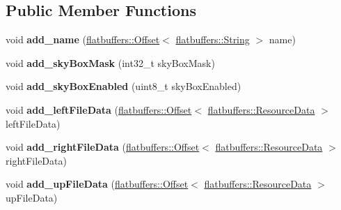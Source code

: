 \subsection*{Public Member Functions}
\begin{DoxyCompactItemize}
\item 
\mbox{\label{structflatbuffers_1_1GameNode3DOptionBuilder_a25a56460a7eba028eaffec8fe47cb77d}} 
void {\bfseries add\+\_\+name} (\hyperlink{structflatbuffers_1_1Offset}{flatbuffers\+::\+Offset}$<$ \hyperlink{structflatbuffers_1_1String}{flatbuffers\+::\+String} $>$ name)
\item 
\mbox{\label{structflatbuffers_1_1GameNode3DOptionBuilder_aefb3c9e9c8c64768e4cdee629ce92241}} 
void {\bfseries add\+\_\+sky\+Box\+Mask} (int32\+\_\+t sky\+Box\+Mask)
\item 
\mbox{\label{structflatbuffers_1_1GameNode3DOptionBuilder_a944f27de427ea6a7b1f48340d83828dd}} 
void {\bfseries add\+\_\+sky\+Box\+Enabled} (uint8\+\_\+t sky\+Box\+Enabled)
\item 
\mbox{\label{structflatbuffers_1_1GameNode3DOptionBuilder_aacdd1c7fdbfa3c948e5015455dd48372}} 
void {\bfseries add\+\_\+left\+File\+Data} (\hyperlink{structflatbuffers_1_1Offset}{flatbuffers\+::\+Offset}$<$ \hyperlink{structflatbuffers_1_1ResourceData}{flatbuffers\+::\+Resource\+Data} $>$ left\+File\+Data)
\item 
\mbox{\label{structflatbuffers_1_1GameNode3DOptionBuilder_acf79802464aaab7d86e77c6a89d4b79a}} 
void {\bfseries add\+\_\+right\+File\+Data} (\hyperlink{structflatbuffers_1_1Offset}{flatbuffers\+::\+Offset}$<$ \hyperlink{structflatbuffers_1_1ResourceData}{flatbuffers\+::\+Resource\+Data} $>$ right\+File\+Data)
\item 
\mbox{\label{structflatbuffers_1_1GameNode3DOptionBuilder_acaf7a327016c7507983e40c2172438b9}} 
void {\bfseries add\+\_\+up\+File\+Data} (\hyperlink{structflatbuffers_1_1Offset}{flatbuffers\+::\+Offset}$<$ \hyperlink{structflatbuffers_1_1ResourceData}{flatbuffers\+::\+Resource\+Data} $>$ up\+File\+Data)

\end{DoxyCompactItemize}
